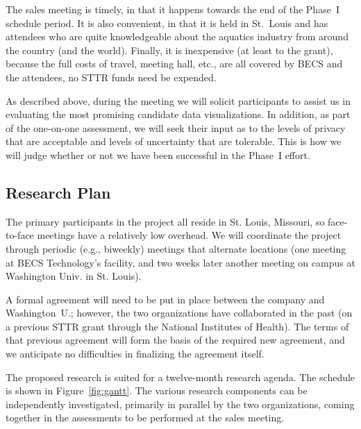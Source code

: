 The sales meeting is timely, in that it happens towards the end of
the Phase~I schedule period.  It is also convenient, in that it is held
in St.~Louis and has attendees who are quite knowledgeable about 
the aquatics industry from around the country (and the world).
Finally, it is inexpensive (at least to the grant), because the full
costs of travel, meeting hall, etc., are all covered by BECS and
the attendees, no STTR funds need be expended.

As described above, during the meeting we will solicit participants
to assist us in evaluating the most promising candidate data visualizations.
In addition, as part of the one-on-one assessment, we will seek their
input as to the levels of privacy that are acceptable and levels of 
uncertainty that are tolerable.
This is how we will judge whether or not we have been successful
in the Phase~I effort.

\subsection{Research Plan}
\label{sec:plan}

The primary participants in the project all reside in St. Louis, Missouri,
so face-to-face meetings have a relatively low overhead. We will coordinate
the project through periodic (e.g., biweekly) meetings that alternate
locations (one meeting at BECS Technology's facility, and two weeks later
another meeting on campus at Washington Univ. in St. Louis).


A formal agreement will need to be put in place between the company and
Washington~U.; however, the two organizations have collaborated in the
past (on a previous STTR grant through the National Institutes of Health).
The terms of that previous agreement will form the
basis of the required new agreement, and we anticipate no difficulties
in finalizing the agreement itself.

The proposed research is suited for a twelve-month research agenda.
The schedule is shown in Figure~\ref{fig:gantt}.
The various research components can be independently investigated,
primarily in parallel by the two organizations, coming together
in the assessments to be performed at the sales meeting.

